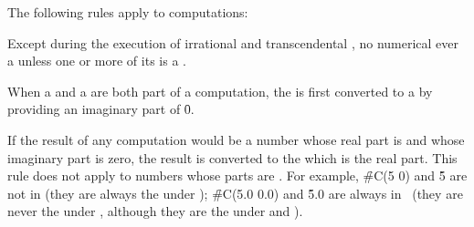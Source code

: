 \endsubsection%

The following rules apply to  computations:


Except during the execution of irrational and transcendental ,
no numerical  ever  a  unless 
one or more of its  is a .

\endsubsubsection%


When a 
and 
a  are both part of a computation, 
the 
is first converted to a  by providing an imaginary part of \f{0}.
\endsubsubsection%


If the result of any computation would be a 
number whose real part is  and whose imaginary
part is zero, the result is converted to the  
which is the real part.
This rule does not apply to  numbers whose parts
are . 
For example, \f{\#C(5 0)} and \f{5} are not   in \clisp
(they are always the  under );
\f{\#C(5.0 0.0)} and \f{5.0} are always   in \clisp\
(they are never the  under ,
although they are the \term{same} under  and \funref{=}).

